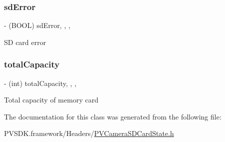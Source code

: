 \subsubsection{\texorpdfstring{sd\+Error}{sdError}}
{\footnotesize\ttfamily -\/ (B\+O\+OL) sd\+Error\hspace{0.3cm}{\ttfamily [read]}, {\ttfamily [write]}, {\ttfamily [nonatomic]}, {\ttfamily [assign]}}

SD card error \mbox{\label{interface_p_v_camera_s_d_card_state_a9cc5c54d277c7d8e09a1a9905bb2228e}} 
\subsubsection{\texorpdfstring{total\+Capacity}{totalCapacity}}
{\footnotesize\ttfamily -\/ (int) total\+Capacity\hspace{0.3cm}{\ttfamily [read]}, {\ttfamily [write]}, {\ttfamily [nonatomic]}, {\ttfamily [assign]}}

Total capacity of memory card 

The documentation for this class was generated from the following file\+:\begin{DoxyCompactItemize}
\item 
P\+V\+S\+D\+K.\+framework/\+Headers/\hyperlink{_p_v_camera_s_d_card_state_8h}{P\+V\+Camera\+S\+D\+Card\+State.\+h}\end{DoxyCompactItemize}
